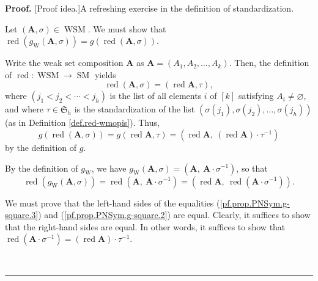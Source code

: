 \documentclass[numbers=enddot,12pt,final,onecolumn,notitlepage]{scrartcl}%
\newcounter{exer}
\theoremstyle{definition}
\newenvironment{fineprint}{\begin{small}}{\end{small}}
\newenvironment{proof}[1][Proof]{\noindent\textbf{#1.} }{\ \rule{0.5em}{0.5em}}
\begin{document}
\begin{proof}
[Proof idea.]A refreshing exercise in the definition of standardization.

\begin{fineprint}
Let $\left(  \mathbf{A},\sigma\right)  \in\operatorname*{WSM}$. We must show
that $\operatorname*{red}\left(  g_{\operatorname*{W}}\left(  \mathbf{A}%
,\sigma\right)  \right)  =g\left(  \operatorname*{red}\left(  \mathbf{A}%
,\sigma\right)  \right)  $.

Write the weak set composition $\mathbf{A}$ as $\mathbf{A}=\left(  A_{1}%
,A_{2},\ldots,A_{k}\right)  $. Then, the definition of $\operatorname*{red}%
:\operatorname*{WSM}\rightarrow\operatorname*{SM}$ yields
\begin{equation}
\operatorname*{red}\left(  \mathbf{A},\sigma\right)  =\left(
\operatorname*{red}\mathbf{A},\tau\right)  , \label{pf.prop.PNSym.g-square.1}%
\end{equation}
where $\left(  j_{1}<j_{2}<\cdots<j_{h}\right)  $ is the list of all elements
$i$ of $\left[  k\right]  $ satisfying $A_{i}\neq\varnothing$, and where
$\tau\in\mathfrak{S}_{h}$ is the standardization of the list $\left(
\sigma\left(  j_{1}\right)  ,\sigma\left(  j_{2}\right)  ,\ldots,\sigma\left(
j_{h}\right)  \right)  $ (as in Definition \ref{def.red-wmopis}). Thus,%
\begin{equation}
g\left(  \operatorname*{red}\left(  \mathbf{A},\sigma\right)  \right)
=g\left(  \operatorname*{red}\mathbf{A},\tau\right)  =\left(
\operatorname*{red}\mathbf{A},\ \left(  \operatorname*{red}\mathbf{A}\right)
\cdot\tau^{-1}\right)  \label{pf.prop.PNSym.g-square.2}%
\end{equation}
by the definition of $g$.

By the definition of $g_{\operatorname*{W}}$, we have $g_{\operatorname*{W}%
}\left(  \mathbf{A},\sigma\right)  =\left(  \mathbf{A},\ \mathbf{A}\cdot
\sigma^{-1}\right)  $, so that
\begin{equation}
\operatorname*{red}\left(  g_{\operatorname*{W}}\left(  \mathbf{A}%
,\sigma\right)  \right)  =\operatorname*{red}\left(  \mathbf{A},\ \mathbf{A}%
\cdot\sigma^{-1}\right)  =\left(  \operatorname*{red}\mathbf{A}%
,\ \operatorname*{red}\left(  \mathbf{A}\cdot\sigma^{-1}\right)  \right)  .
\label{pf.prop.PNSym.g-square.3}%
\end{equation}


We must prove that the left-hand sides of the equalities
(\ref{pf.prop.PNSym.g-square.3}) and (\ref{pf.prop.PNSym.g-square.2}) are
equal. Clearly, it suffices to show that the right-hand sides are equal. In
other words, it suffices to show that $\operatorname*{red}\left(
\mathbf{A}\cdot\sigma^{-1}\right)  =\left(  \operatorname*{red}\mathbf{A}%
\right)  \cdot\tau^{-1}$.


\end{fineprint}
\end{proof}
\end{document}
